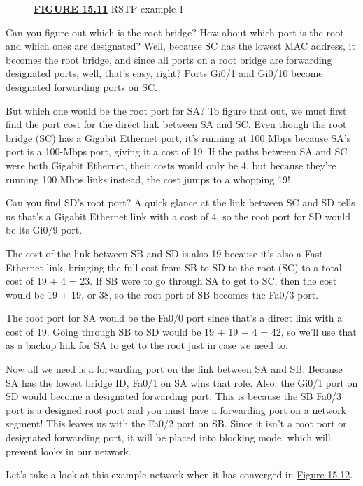 \begin{figure}
\centering
\caption{{\protect\hyperlink{c15.xhtmlux5cux23figureanchor15-11}{\textbf{FIGURE
15.11}} RSTP example 1}}
\end{figure}

Can you figure out which is the root bridge? How about which port is the
root and which ones are designated? Well, because SC has the lowest MAC
address, it becomes the root bridge, and since all ports on a root
bridge are forwarding designated ports, well, that's easy, right? Ports
Gi0/1 and Gi0/10 become designated forwarding ports on SC.

But which one would be the root port for SA? To figure that out, we must
first find the port cost for the direct link between SA and SC. Even
though the root bridge (SC) has a Gigabit Ethernet port, it's running at
100 Mbps because SA's port is a 100-Mbps port, giving it a cost of 19.
If the paths between SA and SC were both Gigabit Ethernet, their
costs would only be
4, but because they're running 100 Mbps links instead, the cost jumps to
a whopping 19!

Can you find SD's root port? A quick glance at the link between SC and
SD tells us that's a Gigabit Ethernet link with a cost of 4, so the root
port for SD would be its Gi0/9 port.

The cost of the link between SB and SD is also 19 because it's also a
Fast Ethernet link, bringing the full cost from SB to SD to the root
(SC) to a total cost of 19 + 4 = 23. If SB were to go through SA to get
to SC, then the cost would be 19 + 19, or 38, so the root port of SB
becomes the Fa0/3 port.

The root port for SA would be the Fa0/0 port since that's a direct link
with a cost of 19. Going through SB to SD would be 19 + 19 + 4 = 42, so
we'll use that as a backup link for SA to get to the root just in case
we need to.

Now all we need is a forwarding port on the link between SA and SB.
Because SA has the lowest bridge ID, Fa0/1 on SA wins that role. Also,
the Gi0/1 port on SD would become a designated forwarding port. This is
because the SB Fa0/3 port is a designed root port and you must have a
forwarding port on a network segment! This leaves us with the Fa0/2 port
on SB. Since it isn't a root port or designated forwarding port, it will
be placed into blocking mode, which will prevent looks in our network.

Let's take a look at this example network when it has converged in
\protect\hyperlink{c15.xhtmlux5cux23figure15-12}{Figure 15.12}.

